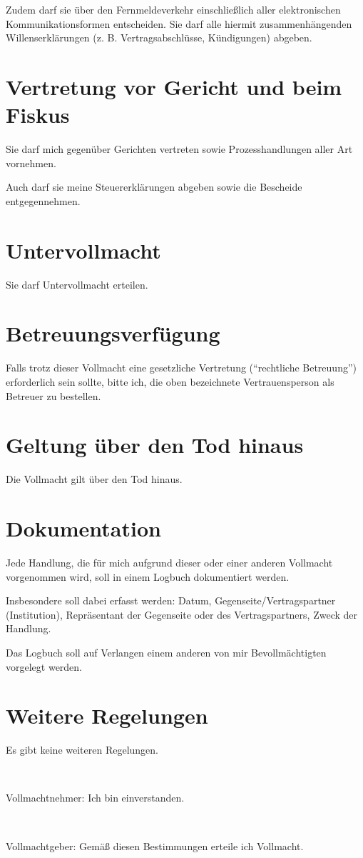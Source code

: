 \documentclass[pdftex,12pt,a4paper]{article}
\begin{document}
Zudem darf sie über den Fernmeldeverkehr einschließlich aller elektronischen
Kommunikationsformen entscheiden. Sie darf alle hiermit zusammenhängenden
Willenserklärungen (z. B. Vertragsabschlüsse, Kündigungen) abgeben. 

\section{Vertretung vor Gericht und beim Fiskus} 

Sie darf mich gegenüber Gerichten vertreten sowie Prozesshandlungen aller Art
vornehmen. 

Auch darf sie meine Steuererklärungen abgeben sowie die Bescheide 
entgegennehmen.

\section{Untervollmacht}

Sie darf Untervollmacht erteilen. 

\section{Betreuungsverfügung}

Falls trotz dieser Vollmacht eine gesetzliche Vertretung (\enquote{rechtliche Betreuung}) erforderlich
sein sollte, bitte ich, die oben bezeichnete Vertrauensperson als Betreuer zu bestellen. 

\section{Geltung über den Tod hinaus}

Die Vollmacht gilt über den Tod hinaus. 

\section{Dokumentation}

Jede Handlung, die für mich aufgrund dieser oder einer anderen 
Vollmacht vorgenommen wird, soll in einem Logbuch dokumentiert werden.

Insbesondere soll dabei erfasst werden: Datum, Gegenseite/Vertragspartner
(Institution), Repräsentant der Gegenseite oder des Vertragspartners,
Zweck der Handlung. 

Das Logbuch soll auf Verlangen einem anderen 
von mir Bevollmächtigten vorgelegt werden. 


\section{Weitere Regelungen}

Es gibt keine weiteren Regelungen.



~

Vollmachtnehmer: Ich bin einverstanden.

\mytrustedone

\signaturefield

~

Vollmachtgeber: Gemäß diesen Bestimmungen erteile ich Vollmacht.

\myfullname

\signaturefield




\end{document}
